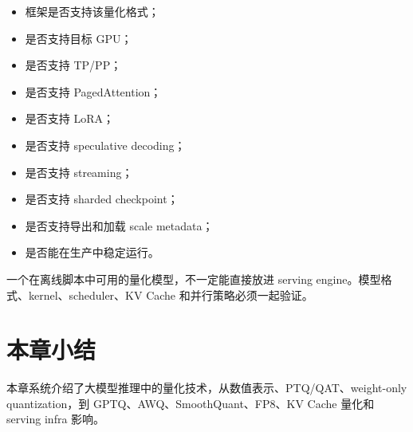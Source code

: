 \begin{itemize}
\item 框架是否支持该量化格式；
\item 是否支持目标 GPU；
\item 是否支持 TP/PP；
\item 是否支持 PagedAttention；
\item 是否支持 LoRA；
\item 是否支持 speculative decoding；
\item 是否支持 streaming；
\item 是否支持 sharded checkpoint；
\item 是否支持导出和加载 scale metadata；
\item 是否能在生产中稳定运行。
\end{itemize}

一个在离线脚本中可用的量化模型，不一定能直接放进 serving engine。模型格式、kernel、scheduler、KV Cache 和并行策略必须一起验证。

\section{本章小结}
\label{sec:chapter15-summary}

本章系统介绍了大模型推理中的量化技术，从数值表示、PTQ/QAT、weight-only quantization，到 GPTQ、AWQ、SmoothQuant、FP8、KV Cache 量化和 serving infra 影响。

